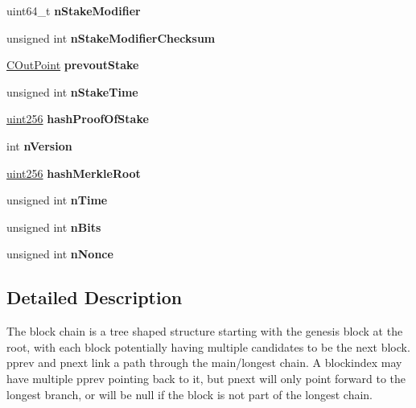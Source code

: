 \begin{DoxyCompactItemize}
\item 
\mbox{\label{class_c_block_index_a2aa226c04d79a4d932ed6eb0abd02cbe}} 
uint64\+\_\+t {\bfseries n\+Stake\+Modifier}
\item 
\mbox{\label{class_c_block_index_ad29fd7c96d1e350aa39c61a2afcfdb26}} 
unsigned int {\bfseries n\+Stake\+Modifier\+Checksum}
\item 
\mbox{\label{class_c_block_index_ac2c040d5e3db73a5ceb87ee4095a405f}} 
\mbox{\hyperlink{class_c_out_point}{C\+Out\+Point}} {\bfseries prevout\+Stake}
\item 
\mbox{\label{class_c_block_index_ae6870336a5bf237680502fa067262af8}} 
unsigned int {\bfseries n\+Stake\+Time}
\item 
\mbox{\label{class_c_block_index_a0618ad34da3f9a1d02ce7a120e055fb9}} 
\mbox{\hyperlink{classuint256}{uint256}} {\bfseries hash\+Proof\+Of\+Stake}
\item 
\mbox{\label{class_c_block_index_a45126301a0a6e26010527a7bbfc1ef58}} 
int {\bfseries n\+Version}
\item 
\mbox{\label{class_c_block_index_a0601b6b2bd6eaedfbc283c00d045a21c}} 
\mbox{\hyperlink{classuint256}{uint256}} {\bfseries hash\+Merkle\+Root}
\item 
\mbox{\label{class_c_block_index_a4b687a226e9e166b0f91c1b616b543a6}} 
unsigned int {\bfseries n\+Time}
\item 
\mbox{\label{class_c_block_index_a3324894e6af612d1bd76f89378435713}} 
unsigned int {\bfseries n\+Bits}
\item 
\mbox{\label{class_c_block_index_a5e0a648ed1df8da171eba636d5ebef01}} 
unsigned int {\bfseries n\+Nonce}
\end{DoxyCompactItemize}


\subsection{Detailed Description}
The block chain is a tree shaped structure starting with the genesis block at the root, with each block potentially having multiple candidates to be the next block. pprev and pnext link a path through the main/longest chain. A blockindex may have multiple pprev pointing back to it, but pnext will only point forward to the longest branch, or will be null if the block is not part of the longest chain. 

